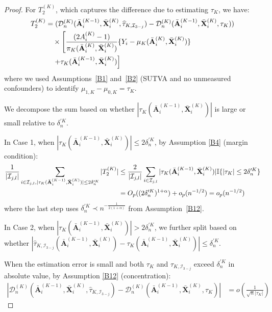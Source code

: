 \documentclass[11pt]{article}
\theoremstyle{referenceplain}
\theoremstyle{referencedefinition}
\theoremstyle{referenceremark}
\begin{document}
\begin{proof}
For $T_2^{(K)}$, which captures the difference due to estimating $\tau_K$, we have:
\begin{align}
T_2^{(K)} &= (\mathcal{D}_n^{(K)}(\bar{\mathbf{A}}_i^{(K-1)},\bar{\mathbf{X}}_i^{(K)},\widehat{\tau}_{K,\mathcal{I}_{3-j}}) - \mathcal{D}_n^{(K)}(\bar{\mathbf{A}}_i^{(K-1)},\bar{\mathbf{X}}_i^{(K)},\tau_K))\notag\\
&\quad \times \left[\frac{(2A_i^{(K)}-1)}{\pi_K(\bar{\mathbf{A}}_i^{(K)},\bar{\mathbf{X}}_i^{(K)})} \{Y_i - \mu_K(\bar{\mathbf{A}}_i^{(K)},\bar{\mathbf{X}}_i^{(K)})\}\right.\notag\\
&\quad \left.+ \tau_K(\bar{\mathbf{A}}_i^{(K-1)},\bar{\mathbf{X}}_i^{(K)})\right]
\end{align}
where we used Assumptions~\ref{B1} and~\ref{B2} (SUTVA and no unmeasured confounders) to identify $\mu_{1,K}-\mu_{0,K}=\tau_K$.

We decompose the sum based on whether $|\tau_K(\bar{\mathbf{A}}_i^{(K-1)},\bar{\mathbf{X}}_i^{(K)})|$ is large or small relative to $\delta_n^{\prime K}$.

In Case 1, when $|\tau_K(\bar{\mathbf{A}}_i^{(K-1)},\bar{\mathbf{X}}_i^{(K)})| \leq 2\delta_n^{\prime K}$, by Assumption \ref{B4} (margin condition):
\begin{align}
    \frac{1}{|\mathcal{I}_{j,l}|}\sum_{i\in\mathcal{I}_{j,l}, |\tau_K(\bar{\mathbf{A}}_i^{(K-1)},\bar{\mathbf{X}}_i^{(K)})| \leq 2\delta_n^{\prime K}} |T_2^{(K)}| &\leq \frac{2}{|\mathcal{I}_{j,l}|}\sum_{i\in\mathcal{I}_{j,l}} |\tau_K(\bar{\mathbf{A}}_i^{(K-1)},\bar{\mathbf{X}}_i^{(K)})| \mathbb{I}\{|\tau_K| \leq 2\delta_n^{\prime K}\}\notag\\
    &= O_p((2\delta_n^{\prime K})^{1+\alpha}) + o_p(n^{-1/2}) = o_p(n^{-1/2})
\end{align}
where the last step uses $\delta_n^{\prime K} \prec n^{-\frac{1}{2(1+\alpha)}}$ from Assumption~\ref{B12}.

In Case 2, when $|\tau_K(\bar{\mathbf{A}}_i^{(K-1)},\allowbreak\bar{\mathbf{X}}_i^{(K)})| > 2\delta_n^{\prime K}$, we further split based on whether $|\widehat{\tau}_{K,\mathcal{I}_{3-j}}(\bar{\mathbf{A}}_i^{(K-1)},\allowbreak\bar{\mathbf{X}}_i^{(K)}) - \allowbreak\tau_K(\bar{\mathbf{A}}_i^{(K-1)},\allowbreak\bar{\mathbf{X}}_i^{(K)})| \leq \delta_n^{\prime K}$.

When the estimation error is small and both $\tau_K$ and $\widehat{\tau}_{K,\mathcal{I}_{3-j}}$ exceed $\delta_n^{\prime K}$ in absolute value, by Assumption \ref{B12} (concentration):
\begin{align}
    |\mathcal{D}_n^{(K)}(\bar{\mathbf{A}}_i^{(K-1)},\bar{\mathbf{X}}_i^{(K)},\widehat{\tau}_{K,\mathcal{I}_{3-j}}) - \mathcal{D}_n^{(K)}(\bar{\mathbf{A}}_i^{(K-1)},\bar{\mathbf{X}}_i^{(K)},\tau_K)| &= o\left(\frac{1}{\sqrt{n}|\tau_K|}\right)
\end{align}


\end{proof}
\end{document}
